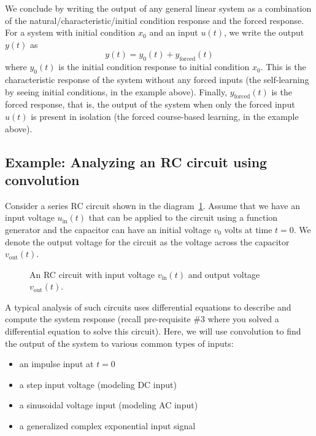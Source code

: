 \documentclass{ee102_notes}
\begin{document}
We conclude by writing the output of any general linear system as a combination of the natural/characteristic/initial condition response and the forced response. For a system with initial condition $x_0$ and an input $u(t)$, we write the output $y(t)$ as
\[
y(t) = y_{0}(t) + y_{\text{forced}}(t)
\]
where $y_0(t)$ is the initial condition response to initial condition $x_0$. This is the characteristic response of the system without any forced inputs (the self-learning by seeing initial conditions, in the example above). Finally, $y_{\text{forced}}(t)$ is the forced response, that is, the output of the system when only the forced input $u(t)$ is present in isolation (the forced course-based learning, in the example above). 
\subsection{Example: Analyzing an RC circuit using convolution}
Consider a series RC circuit shown in the diagram~\ref{fig:rc-circuit}. Assume that we have an input voltage $u_{\text{in}}(t)$ that can be applied to the circuit using a function generator and the capacitor can have an initial voltage $v_0$ volts at time $t = 0$. We denote the output voltage for the circuit as the voltage across the capacitor $v_{\text{out}}(t)$. 
\begin{figure}
\centering
{}
\caption{An RC circuit with input voltage $v_{\text{in}}(t)$ and output voltage $v_{\text{out}}(t)$.}
\label{fig:rc-circuit}
\end{figure}
A typical analysis of such circuits uses differential equations to describe and compute the system response (recall pre-requisite \#3 where you solved a differential equation to solve this circuit). Here, we will use convolution to find the output of the system to various common types of inputs: 

\begin{itemize}
\item an impulse input at $t=0$
\item a step input voltage (modeling DC input)
\item a sinusoidal voltage input (modeling AC input)
\item a generalized complex exponential input signal
\end{itemize}
\end{document}

